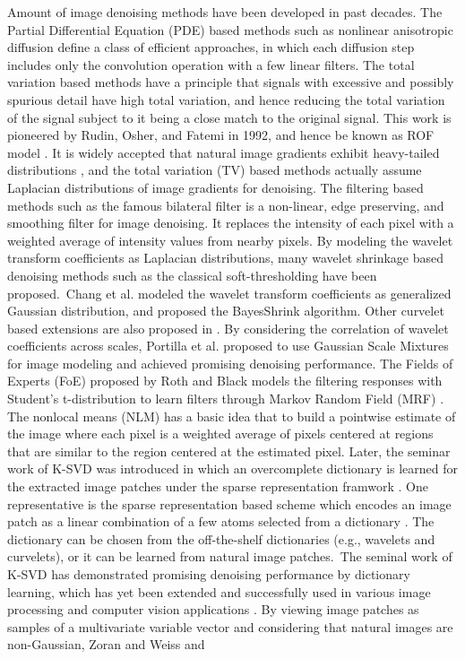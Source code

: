 Amount of image denoising methods have been developed in past decades. The Partial Differential Equation (PDE) based methods such as nonlinear anisotropic diffusion \cite{PeronaMalik1990} define a class of efficient approaches, in which each diffusion step includes only the convolution operation with a few linear filters. The total variation based methods \cite{rudin1992nonlinear,osher2005iterative} have a principle that signals with excessive and possibly spurious detail have high total variation, and hence reducing the total variation of the signal subject to it being a close match to the original signal. This work is pioneered by Rudin, Osher, and Fatemi in 1992, and hence be known as ROF model \cite{rudin1992nonlinear}. It is widely accepted that natural image gradients exhibit heavy-tailed distributions \cite{weiss}, and the total variation (TV) based methods \cite{rudin1992nonlinear,osher2005iterative} actually assume Laplacian distributions of image gradients for denoising. The filtering based methods such as the famous bilateral filter \cite{Tomasi1998} is a non-linear, edge preserving, and smoothing filter for image denoising. It replaces the intensity of each pixel with a weighted average of intensity values from nearby pixels. By modeling the wavelet transform coefficients as Laplacian distributions, many wavelet shrinkage based denoising methods such as the classical soft-thresholding \cite{softthresholding} have been proposed.\ Chang et al. modeled the wavelet transform coefficients as generalized Gaussian distribution, and proposed the BayesShrink \cite{bayesshrink} algorithm. Other curvelet based extensions are also proposed in \cite{curvelet}. By considering the correlation of wavelet coefficients across scales, Portilla et al. \cite{blsgsm} proposed to use Gaussian Scale Mixtures for image modeling and achieved promising denoising performance.  The Fields of Experts (FoE) \cite{foe} proposed by Roth and Black models the filtering responses with Student's t-distribution to learn filters through Markov Random Field (MRF) \cite{Bishop}. The nonlocal means (NLM) \cite{nlm} has a basic idea that to build a pointwise estimate of the image where each pixel is a weighted average of pixels centered at regions that are similar to the region centered at the estimated pixel. Later, the seminar work of K-SVD \cite{ksvd} was introduced in which an overcomplete dictionary is learned for the extracted image patches under the sparse representation framwork \cite{olshausen1997sparse,olshausen1996emergence}. One representative is the sparse representation based scheme which encodes an image patch as a linear combination of a few atoms selected from a dictionary \cite{olshausen1996emergence,olshausen1997sparse,ksvd}. The dictionary can be chosen from the off-the-shelf dictionaries (e.g., wavelets and curvelets), or it can be learned from natural image patches.\ The seminal work of K-SVD \cite{ksvdtsp,ksvd} has demonstrated promising denoising performance by dictionary learning, which has yet been extended and successfully used in various image processing and computer vision applications \cite{srcolor,srcvpr,lcksvd}. By viewing image patches as samples of a multivariate variable vector and considering that natural images are non-Gaussian, Zoran and Weiss \cite{epll,gmmnips} and 